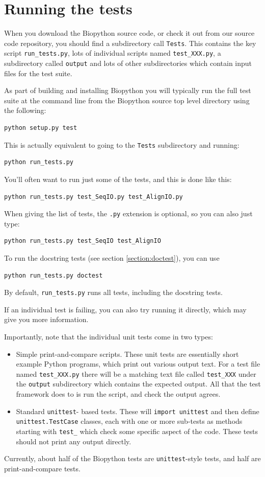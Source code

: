 \documentclass{report}
\begin{document}
\section{Running the tests}

When you download the Biopython source code, or check it out from
our source code repository, you should find a subdirectory call
\verb|Tests|.  This contains the key script \verb|run_tests.py|,
lots of individual scripts named \verb|test_XXX.py|, a subdirectory
called \verb|output| and lots of other subdirectories which
contain input files for the test suite.

As part of building and installing Biopython you will typically
run the full test suite at the command line from the Biopython
source top level directory using the following:
\begin{verbatim}
python setup.py test
\end{verbatim}
This is actually equivalent to going to the \verb|Tests|
subdirectory and running:
\begin{verbatim}
python run_tests.py
\end{verbatim}

You'll often want to run just some of the tests, and this is done
like this:
\begin{verbatim}
python run_tests.py test_SeqIO.py test_AlignIO.py
\end{verbatim}
When giving the list of tests, the \verb|.py| extension is optional,
so you can also just type:
\begin{verbatim}
python run_tests.py test_SeqIO test_AlignIO
\end{verbatim}
To run the docstring tests (see section \ref{section:doctest}), you can use
\begin{verbatim}
python run_tests.py doctest
\end{verbatim}
By default, \verb|run_tests.py| runs all tests, including the docstring tests.

If an individual test is failing, you can also try running it
directly, which may give you more information.

Importantly, note that the individual unit tests come in two types:
\begin{itemize}
\item Simple print-and-compare scripts.  These unit tests are
      essentially short example Python programs, which print out
      various output text.  For a test file named \verb|test_XXX.py|
      there will be a matching text file called \verb|test_XXX| under
      the \verb|output| subdirectory which contains the expected
      output.  All that the test framework does to is run the script,
      and check the output agrees.
\item Standard \verb|unittest|- based tests.  These will \verb|import unittest|
      and then define \verb|unittest.TestCase| classes, each with one
      or more sub-tests as methods starting with \verb|test_| which
      check some specific aspect of the code.
      These tests should not print any output directly.
\end{itemize}
Currently, about half of the Biopython tests are \verb|unittest|-style tests, and half are print-and-compare tests.
\end{document}
